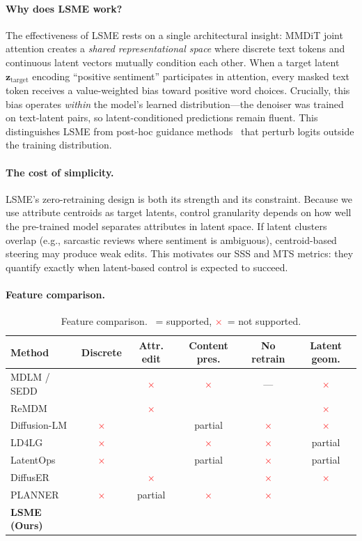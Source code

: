 \documentclass{article}
\newcommand{\gc}{\checkmark}
\newcommand{\rx}{\textcolor{red}{$\times$}}
\begin{document}
\paragraph{Why does LSME work?}
The effectiveness of LSME rests on a single architectural insight: MMDiT joint attention creates a \emph{shared representational space} where discrete text tokens and continuous latent vectors mutually condition each other.
When a target latent $\mathbf{z}_\text{target}$ encoding ``positive sentiment'' participates in attention, every masked text token receives a value-weighted bias toward positive word choices.
Crucially, this bias operates \emph{within} the model's learned distribution---the denoiser was trained on text-latent pairs, so latent-conditioned predictions remain fluent.
This distinguishes LSME from post-hoc guidance methods~\citep{nisonoff2025} that perturb logits outside the training distribution.

\paragraph{The cost of simplicity.}
LSME's zero-retraining design is both its strength and its constraint.
Because we use attribute centroids as target latents, control granularity depends on how well the pre-trained model separates attributes in latent space.
If latent clusters overlap (e.g., sarcastic reviews where sentiment is ambiguous), centroid-based steering may produce weak edits.
This motivates our SSS and MTS metrics: they quantify exactly when latent-based control is expected to succeed.

\paragraph{Feature comparison.}

\begin{table}[t]
\centering
\caption{Feature comparison. \gc\ = supported, \rx\ = not supported.}
\label{tab:feature_comparison}
\small
\begin{tabular}{lccccc}
\toprule
\textbf{Method} & \textbf{Discrete} & \textbf{Attr. edit} & \textbf{Content pres.} & \textbf{No retrain} & \textbf{Latent geom.} \\
\midrule
MDLM / SEDD & \gc & \rx & \rx & --- & \rx \\
ReMDM & \gc & \rx & \gc & \gc & \rx \\
Diffusion-LM & \rx & \gc & partial & \rx & \rx \\
LD4LG & \rx & \gc & \rx & \rx & partial \\
LatentOps & \rx & \gc & partial & \rx & partial \\
DiffusER & \gc & \rx & \gc & \rx & \rx \\
PLANNER & \rx & partial & \rx & \rx & \gc \\
\textbf{LSME (Ours)} & \gc & \gc & \gc & \gc & \gc \\
\bottomrule
\end{tabular}
\end{table}
\end{document}
